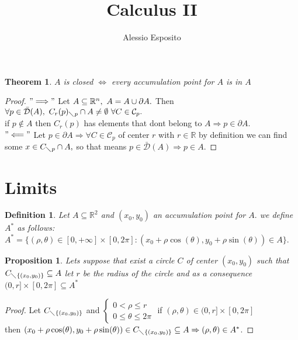 \documentclass{article}
\title{Calculus II}
\author{Alessio Esposito}
\newtheorem{theorem}{Theorem}
\newtheorem{proposition}{Proposition}
\newtheorem{definition}{Definition}
\begin{document}
\maketitle

    \begin{theorem}
        $A$ is closed $\Longleftrightarrow$ every accumulation point for $A$ is in $A$ \hfill    
    \end{theorem}
    \begin{proof}
        $"\Longrightarrow"$ Let $A \subseteq \mathbb{R}^n, \ A = A \cup \partial A. \\$ Then $\forall  p \in \bar{\mathcal{D}} (A), \ C_r(p)_{\diagdown p}\cap A \neq \emptyset \ \forall  C \in \mathcal{C}_p.$ \\
        if $ p \notin A $ then $C_r(p)$ has elements that dont belong to $A \Rightarrow p \in \partial A.$ \\
        $"\Longleftarrow"$ Let $p \in \partial A \Rightarrow \forall C \in \mathcal{C}_p$ of center $r$ with $r \in \mathbb{R}$ by definition we can find some $x \in C_{\diagdown p} \cap A, $ so that means $p \in \bar{\mathcal{D}} (A) \Rightarrow p \in A.$       
    \end{proof}

\section{Limits}

    \begin{definition}
        Let $A \subseteq \mathbb{R}^2$ and $(x_0,y_0)$ an accumulation point for $A.$ we define $A^*$ as follows: \\ 
        $A^* = \{(\rho , \theta) \in [0, +\infty ] \times [0, 2\pi] : (x_0 + \rho \cos(\theta), y_0 + \rho \sin(\theta)) \in A \}.$

    \end{definition}
        
    \begin{proposition}
        Lets suppose that exist a circle $C$ of center $(x_0,y_0)$ such that $C_{\diagdown \{ (x_0,y_0) \}} \subseteq A$ let $r$ be the radius of the circle and as a consequence $(0,r] \times [0,2\pi] \subseteq A^*$
    \end{proposition}
    
    \begin{proof}
        Let $C_{\diagdown \{ (x_0,y_0) \}}$ and
            $\begin{cases}
                0 < \rho \leqslant r \\
                0 \leqslant \theta \leqslant 2\pi
            \end{cases}$
            if $(\rho, \theta) \in (0,r] \times [0,2\pi]$ \\ then $(x_0 + \rho \cos(\theta), y_0 + \rho \sin(\theta)) \in C_{\diagdown \{ (x_0,y_0) \}} \subseteq A \Rightarrow (\rho, \theta) \in A^*$.
    \end{proof}
        
\end{document}
